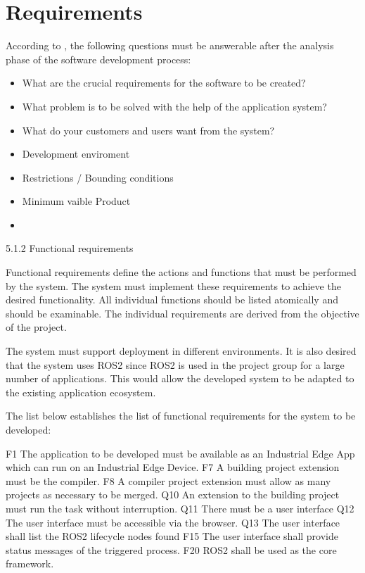 	\section{Requirements}
	According to \cite{Koubaa2021}, the following questions must be answerable after the analysis phase of the software development process:
	\begin{itemize}
		\item What are the crucial requirements for the software to be created?
		\item What problem is to be solved with the help of the application system?
		\item What do your customers and users want from the system?
		\item Development enviroment
		\item Restrictions / Bounding conditions
		\item Minimum vaible Product
		\item 
	\end{itemize}

5.1.2 Functional requirements

Functional requirements define the actions and functions that must be performed by the system. The system must implement these requirements to achieve the desired functionality. All individual functions should be listed atomically and should be examinable. The individual requirements are derived from the objective of the project. 

The system must support deployment in different environments. It is also desired that the system uses ROS2 since ROS2 is used in the project group for a large number of applications. This would allow the developed system to be adapted to the existing application ecosystem.

The list below establishes the list of functional requirements for the system to be developed:

F1 The application to be developed must be available as an Industrial Edge App which can run on an Industrial Edge Device.
F7 A building project extension must be the compiler.
F8 A compiler project extension must allow as many projects as necessary to be merged.
Q10 An extension to the building project must run the task without interruption.
Q11 There must be a user interface
Q12 The user interface must be accessible via the browser.
Q13 The user interface shall list the ROS2 lifecycle nodes found
F15 The user interface shall provide status messages of the triggered process.
F20 ROS2 shall be used as the core framework.
